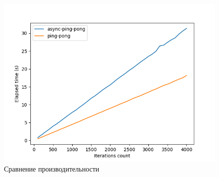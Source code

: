 \documentclass[t]{beamer}  %
\begin{document}
 \begin{frame}[fragile]
	\frametitle{\insertsection} 
	\framesubtitle{\insertsubsection}
	\vspace{-0.4cm}
	\begin{figure}
		\includegraphics[width=0.8\linewidth]{images/async-ping-pong}
		\caption*{Сравнение производительности}
	\end{figure}
 \end{frame}





\end{document}
